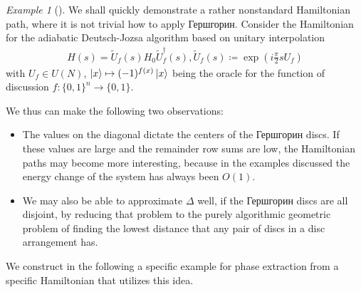 \documentclass[10pt]{amsart}
\theoremstyle{definition}
\theoremstyle{remark}
\newtheorem{example}[theorem]{Example}
\begin{document}
    \begin{example}[{\cite[pp. 12-13]{Albash}}]
        We shall quickly demonstrate a rather nonstandard Hamiltonian path, where it is not trivial how to apply Гершгорин. Consider the Hamiltonian for the adiabatic Deutsch-Jozsa algorithm based on unitary interpolation
        \begin{align}
            H(s) = \tilde{U}_f(s)H_0\tilde{U}_f^\dagger(s), \tilde{U}_f(s) \coloneqq \exp\left(i\frac{\pi}{2}sU_f\right)
        \end{align}
        with \(U_f \in U(N)\), \(\ket{x} \mapsto (-1)^{f(x)}\ket{x}\) being the oracle for the function of discussion \(f\colon \{0, 1\}^n \to \{0, 1\}\).
    \end{example}

    We thus can make the following two observations:
    \begin{itemize}[wide]
        \item The values on the diagonal dictate the centers of the Гершгорин discs. If these values are large and the remainder row sums are low, the Hamiltonian paths may become more interesting, because in the examples discussed the energy change of the system has always been \(O(1)\).
        \item We may also be able to approximate \(\Delta\) well, if the Гершгорин discs are all disjoint, by reducing that problem to the purely algorithmic geometric problem of finding the lowest distance that any pair of discs in a disc arrangement has.
    \end{itemize}
    We construct in the following a specific example for phase extraction from a specific Hamiltonian that utilizes this idea.
\end{document}
